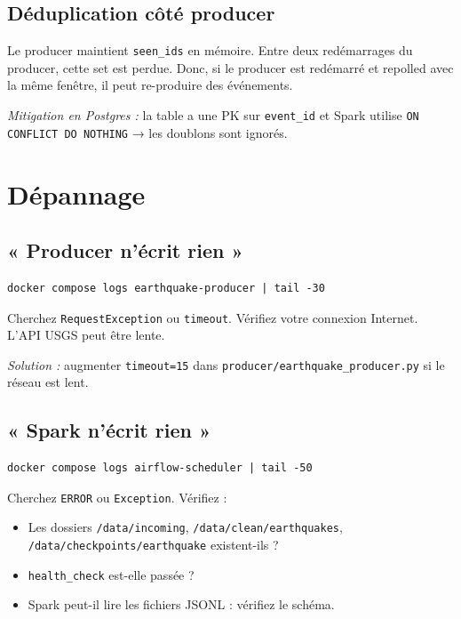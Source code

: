 \documentclass[12pt, a4paper]{article}
\begin{document}
\subsection{Déduplication côté producer}

Le producer maintient \texttt{seen\_ids} en mémoire. Entre deux redémarrages du producer, cette set est perdue. Donc, si le producer est redémarré et repolled avec la même fenêtre, il peut re-produire des événements.

\textit{Mitigation en Postgres :} la table a une PK sur \texttt{event\_id} et Spark utilise \texttt{ON CONFLICT DO NOTHING} → les doublons sont ignorés.

\section{Dépannage}

\subsection{« Producer n'écrit rien »}

\begin{lstlisting}
docker compose logs earthquake-producer | tail -30
\end{lstlisting}

Cherchez \texttt{RequestException} ou \texttt{timeout}. Vérifiez votre connexion Internet. L'API USGS peut être lente.

\textit{Solution :} augmenter \texttt{timeout=15} dans \texttt{producer/earthquake\_producer.py} si le réseau est lent.

\subsection{« Spark n'écrit rien »}

\begin{lstlisting}
docker compose logs airflow-scheduler | tail -50
\end{lstlisting}

Cherchez \texttt{ERROR} ou \texttt{Exception}. Vérifiez :
\begin{itemize}
  \item Les dossiers \texttt{/data/incoming}, \texttt{/data/clean/earthquakes}, \texttt{/data/checkpoints/earthquake} existent-ils ?
  \item \texttt{health\_check} est-elle passée ?
  \item Spark peut-il lire les fichiers JSONL : vérifiez le schéma.
\end{itemize}
\end{document}
